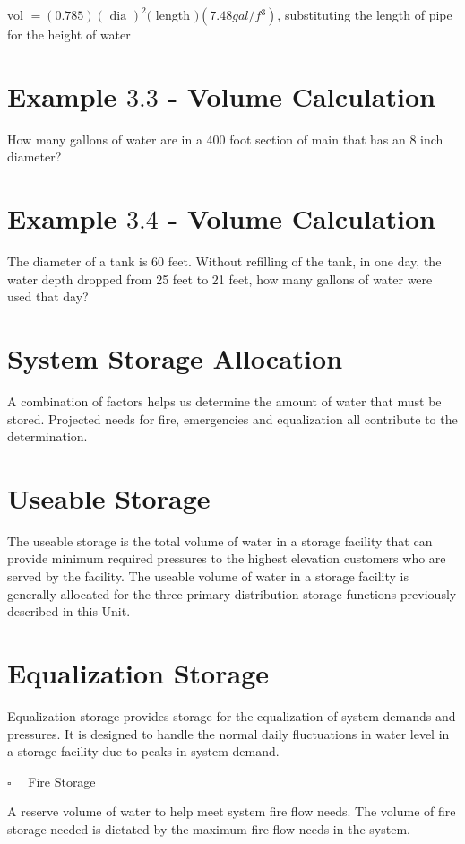\documentclass[10pt]{article}
\begin{document}
vol $=(0.785)(\text { dia })^{2}($ length $)\left(7.48 g a l / f{ }^{3}\right)$, substituting the length of pipe for the height of water

\section{Example $3.3$ - Volume Calculation}
How many gallons of water are in a 400 foot section of main that has an 8 inch diameter?

\section{Example $3.4$ - Volume Calculation}
The diameter of a tank is 60 feet. Without refilling of the tank, in one day, the water depth dropped from 25 feet to 21 feet, how many gallons of water were used that day?

\section{System Storage Allocation}
A combination of factors helps us determine the amount of water that must be stored. Projected needs for fire, emergencies and equalization all contribute to the determination.

\section{Useable Storage}
The useable storage is the total volume of water in a storage facility that can provide minimum required pressures to the highest elevation customers who are served by the facility. The useable volume of water in a storage facility is generally allocated for the three primary distribution storage functions previously described in this Unit.

\section{Equalization Storage}
Equalization storage provides storage for the equalization of system demands and pressures. It is designed to handle the normal daily fluctuations in water level in a storage facility due to peaks in system demand.

$\square \quad$ Fire Storage

A reserve volume of water to help meet system fire flow needs. The volume of fire storage needed is dictated by the maximum fire flow needs in the system.
\end{document}
